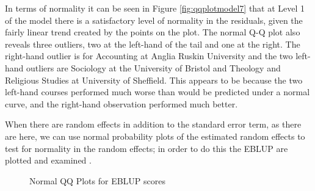 \documentclass[11pt,a4paper]{report}
\begin{document}
In terms of normality it can be seen in Figure \ref{fig:qqplotmodel7} that at Level 1 of the model there is a satisfactory level of normality in the residuals, given the fairly linear trend created by the points on the plot. The normal Q-Q plot also reveals three outliers, two at the left-hand of the tail and one at the right. The right-hand outlier is for Accounting at Anglia Ruskin University and the two left-hand outliers are Sociology at the University of Bristol and Theology and Religious Studies at University of Sheffield. This appears to be because the two left-hand courses performed much worse than would be predicted under a normal curve, and the right-hand observation performed much better. 

When there are random effects in addition to the standard error term, as there are here, we can use normal probability plots of the estimated random effects to test for normality in the random effects; in order to do this the \ac{EBLUP} are plotted and examined \cite{Lawson201412}. 

\begin{figure}[h]
	\centering
		\caption{Normal QQ Plots for EBLUP scores}
		\label{fig:EBLUPplots}
\end{figure}
		
\end{document}
